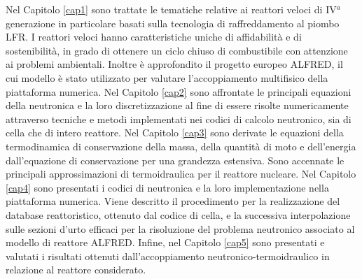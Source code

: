 




Nel Capitolo \ref{cap1} sono trattate le tematiche relative ai reattori veloci 
di IV$^{a}$ generazione in particolare basati sulla tecnologia di raffreddamento al 
piombo LFR.
I reattori veloci hanno caratteristiche uniche di affidabilità e di 
sostenibilità, in grado di ottenere un ciclo chiuso di combustibile con 
attenzione ai problemi ambientali. Inoltre è approfondito il progetto europeo 
ALFRED, il cui modello è stato utilizzato per valutare l'accoppiamento 
multifisico della piattaforma numerica.
Nel Capitolo \ref{cap2} sono affrontate le principali equazioni della neutronica 
e la loro discretizzazione al fine di essere risolte numericamente attraverso 
tecniche e metodi implementati nei codici di calcolo neutronico, sia di cella 
che di intero reattore.
Nel Capitolo \ref{cap3} sono derivate le equazioni della termodinamica di 
conservazione della massa, della quantità di moto e dell'energia dall'equazione 
di conservazione per una grandezza estensiva. Sono accennate le principali 
approssimazioni di termoidraulica per il reattore nucleare.
Nel Capitolo \ref{cap4} sono presentati i codici di neutronica e la loro 
implementazione nella piattaforma numerica.
Viene descritto il procedimento per la realizzazione del database reattoristico, 
ottenuto dal codice di cella, e la successiva interpolazione sulle sezioni 
d'urto efficaci per la risoluzione del problema neutronico associato al modello 
di reattore ALFRED. 
Infine, nel Capitolo \ref{cap5} sono presentati e valutati i risultati ottenuti 
dall'accoppiamento neutronico-termoidraulico in relazione al reattore considerato. 



